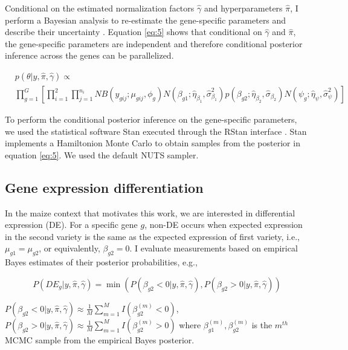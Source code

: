 Conditional on the estimated normalization factors $\hat{\gamma}$ and hyperparameters $\hat{\pi}$, I perform a Bayesian analysis to re-estimate the gene-specific parameters and describe their uncertainty \citep{niemi2015empirical}. Equation \ref{eq:5} shows that conditional on $\hat{\gamma}$ and $\hat{\pi}$, the gene-specific parameters are independent and therefore conditional posterior inference across the genes can be parallelized. 

\begin{equation}
\label{eq:5}
\begin{split}
& p(\theta | y, \hat{\pi}, \hat{\gamma})  \propto \\ & \prod_{g=1}^{G} \left[ \prod_{i=1}^{2} \prod_{j=1}^{n_i} NB(y_{gij} ; \mu_{gij}, \phi_g) N(\beta_{g1} ; \hat{\eta}_{\beta_1}, \hat{\sigma}^2_{\beta_1}) p(\beta_{g2} ; \hat{\eta}_{\beta_2}, \hat{\sigma}_{\beta_2}) N(\psi_g ; \hat{\eta}_{\psi}, \hat{\sigma}^2_{\psi})  \right]
\end{split}
\end{equation}

To perform the conditional posterior inference on the gene-specific parameters, we used the statistical software Stan \citep{stan2014stan} executed through the RStan interface \citep{team2016rstan}. Stan implements a Hamiltonion Monte Carlo \citep{neal2011mcmc} to obtain samples from the posterior in equation \ref{eq:5}. We used the default NUTS sampler\citep{annis2017bayesian}.


\subsection{Gene expression differentiation}

In the maize context that motivates this work, we are interested in differential expression (DE). For a specific gene $g$, non-DE occurs when expected expression in the second variety is the same as the expected expression of first variety, i.e., $\mu_{g1} = \mu_{g2}$, or equivalently, $\beta_{g2}=0$.  I evaluate measurements based on empirical Bayes estimates of their posterior probabilities, e.g., 

\begin{equation}
\label{eq:6}
P(DE_g | y, \hat{\pi}, \hat{\gamma}) =\min( P(\beta_{g2}< 0 | y, \hat{\pi}, \hat{\gamma}),  P(\beta_{g2}> 0 | y, \hat{\pi}, \hat{\gamma}))
\end{equation}

$P(\beta_{g2}< 0 | y, \hat{\pi}, \hat{\gamma}) \approx \frac{1}{M} \sum_{m=1}^M I(\beta_{g2} ^ {(m)} < 0)$, $P(\beta_{g2}> 0 | y, \hat{\pi}, \hat{\gamma}) \approx \frac{1}{M} \sum_{m=1}^M I(\beta_{g2} ^ {(m)} > 0) $
where $\beta_{g1}^{(m)}, \beta_{g2}^{(m)}$ is the $m^{th}$ MCMC sample from the empirical Bayes posterior.


